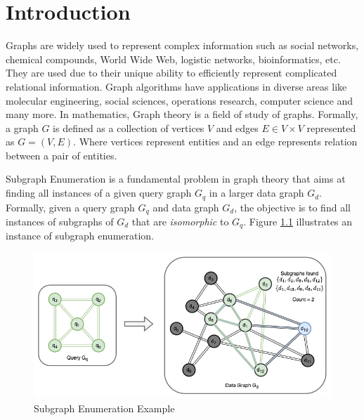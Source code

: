 \chapter{Introduction}\label{chap:Intro}

Graphs are widely used to represent complex information such as social networks, chemical compounds, World Wide Web, logistic networks, bioinformatics, etc.
They are used due to their unique ability to efficiently represent complicated relational information.
Graph algorithms have applications in diverse areas like molecular engineering, social sciences, operations research, computer science and many more.
In mathematics, Graph theory is a field of study of graphs. Formally, a graph $G$ is defined as a collection of vertices $V$ and edges $E \in V \times V$ represented as $G=(V,E)$. Where vertices represent entities and an edge represents relation between a pair of entities.

Subgraph Enumeration is a fundamental problem in graph theory that aims at finding all instances of a given query graph $G_q$ in a larger data graph $G_d$.
Formally, given a query graph $G_q$ and data graph $G_d$, the objective is to find all instances of subgraphs of $G_d$ that are \textit{isomorphic} to $G_q$. Figure \ref{fig:sgm-intro} illustrates an instance of subgraph enumeration.

\begin{figure}
    \includegraphics[width=\textwidth]{fig/sgm-intro-double.png}
    \caption{Subgraph Enumeration Example}
    \label{fig:sgm-intro}
\end{figure}

